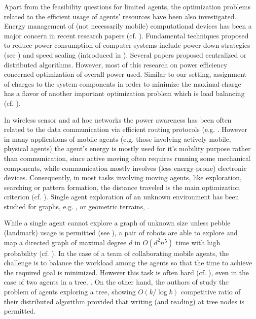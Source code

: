 \documentclass{article}
\begin{document}
Apart from the feasibility questions for limited agents, the optimization problems related to the efficient usage of agents' resources have been also investigated. Energy management of (not necessarily mobile) computational devices has been a major concern in recent research papers (cf. \cite{Albers}). Fundamental techniques proposed to reduce power consumption of computer systems include power-down strategies (see \cite{Albers,AIS,ISG}) and speed scaling (introduced in \cite{YDS}). Several papers proposed centralized \cite{Bunde,SL,YDS} or distributed  \cite{Albers,Ambuhl,AIS,ISG} algorithms. However, most of this research on power efficiency concerned optimization of overall power used. Similar to our setting, assignment of charges to the system components in order to minimize the maximal charge has a flavor of another important optimization problem which is load balancing (cf. \cite{Azar}).

In wireless sensor and ad hoc networks the power awareness has been often related to the data communication via efficient routing protocols (e.g. \cite{Ambuhl,SL}. However in many applications of mobile agents (e.g. those involving actively mobile, physical agents) the agent's energy is mostly used for it's mobility purpose rather than communication, since active moving often requires running some mechanical components, while communication mostly involves (less energy-prone) electronic devices.
Consequently, in most tasks involving moving agents, like exploration, searching or pattern formation, the distance traveled is the main optimization criterion (cf. \cite{AH,AG,ABRS,BCR,BeRS,BlRS,DP,DKS,FGKP,MMS}). Single agent exploration of an unknown environment has been studied for graphs, e.g. \cite{AH,DP}, or geometric terrains, \cite{BCR,BlRS}. 

While a single agent cannot explore a graph of unknown size unless pebble (landmark) usage is permitted (see \cite{BFRSV}), a pair of robots are able to explore and map a directed graph of maximal degree $d$ in $O(d^2n^5)$ time with high probability (cf. \cite{BS}). In the case of a team of collaborating mobile agents, the challenge is to balance the workload among the agents so that the time to achieve the required goal is minimized. However this task is often hard (cf. \cite{FHK}), even in the case of two agents in a tree, \cite{AB}. On the other hand, the authors of \cite{FGKP} study the problem of agents exploring a tree, showing $O(k/ \log k)$ competitive ratio of their distributed algorithm provided that writing (and reading) at tree nodes is permitted. 
\end{document}
